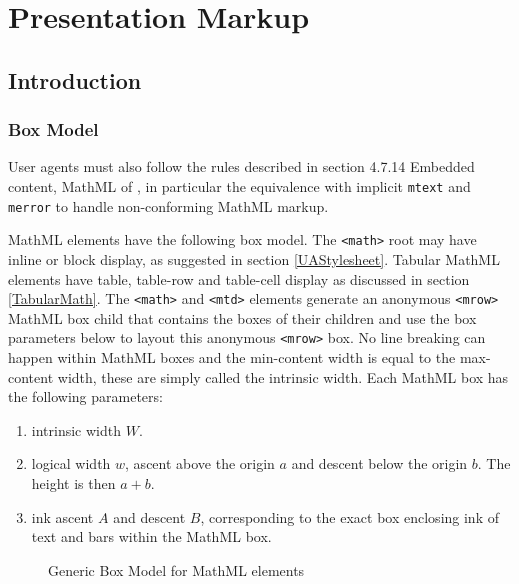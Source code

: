 \section{Presentation Markup}\label{PresentationMarkup}

\subsection{Introduction}

\subsubsection{Box Model}\label{BoxModel}

User agents must also follow the rules described in section 4.7.14
Embedded content, MathML of \cite{HTML5}, in particular the equivalence with
implicit {\tt mtext} and {\tt merror} to handle non-conforming MathML markup.

MathML elements have the following box model. The {\tt <math>} root may have
inline or block display, as suggested in section \ref{UAStylesheet}.
Tabular MathML elements have table, table-row and
table-cell display as discussed in section \ref{TabularMath}.
The {\tt <math>} and {\tt <mtd>} elements
generate an anonymous {\tt <mrow>} MathML box child that contains the boxes of
their children and use the box parameters below to layout this anonymous
{\tt <mrow>} box.
No line breaking can happen within MathML boxes and the min-content width is
equal to the max-content width, these are simply called the intrinsic width.
Each MathML box has the following parameters:

\begin{enumerate}
\item intrinsic width $W$.
\item logical width $w$, ascent above the origin $a$ and descent below the
  origin $b$. The height is then $a+b$.
\item ink ascent $A$ and descent $B$, corresponding to the exact box enclosing
  ink of text and bars within the MathML box.
\end{enumerate}

\begin{figure}
\centering
{}
\caption{Generic Box Model for MathML elements}
\label{fig:MathMLBoxModel}
\end{figure}

